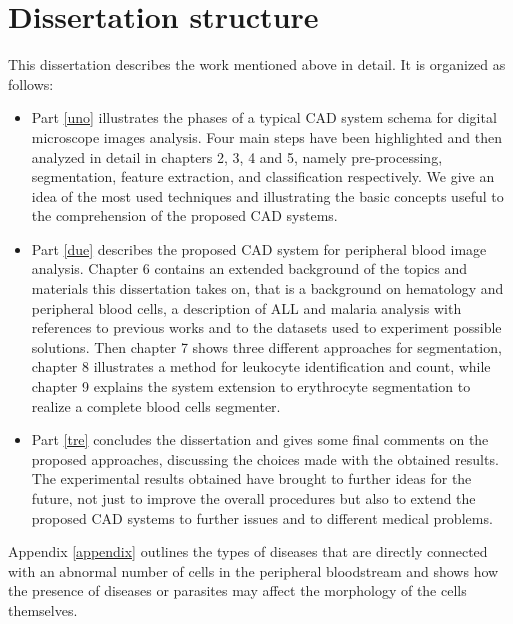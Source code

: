 \section{Dissertation structure} 
This dissertation describes the work mentioned above in detail. It is organized as follows:
\begin{itemize}
	\item Part \ref{uno} illustrates the phases of a typical CAD system schema for digital microscope images analysis. Four main steps have been highlighted and then analyzed in detail in chapters 2, 3, 4 and 5, namely pre-processing, segmentation, feature extraction, and classification respectively. We give an idea of the most used techniques and illustrating the basic concepts useful to the comprehension of the proposed CAD systems.
	
	\item Part \ref{due} describes the proposed CAD system for peripheral blood image analysis. Chapter 6 contains an extended background of the topics and materials this dissertation takes on, that is a background on hematology and peripheral blood cells, a description of ALL and malaria analysis with references to previous works and to the datasets used to experiment possible solutions. Then chapter 7 shows three different approaches for segmentation, chapter 8 illustrates a method for leukocyte identification and count, while chapter 9 explains the system extension to erythrocyte segmentation to realize a complete blood cells segmenter.
	
	\item Part \ref{tre} concludes the dissertation and gives some final comments on the proposed approaches, discussing the choices made with the obtained results. The experimental results obtained have brought to further ideas for the future, not just to improve the overall procedures but also to extend the proposed CAD systems to further issues and to different medical problems. 
\end{itemize}
Appendix \ref{appendix} outlines the types of diseases that are directly connected with an abnormal number of cells in the peripheral bloodstream and shows how the presence of diseases or parasites may affect the morphology of the cells themselves.